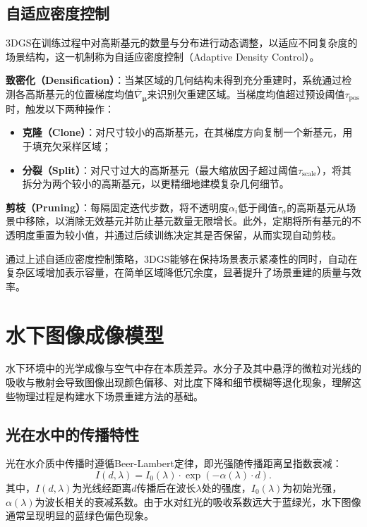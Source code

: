 \subsection{自适应密度控制}

3DGS在训练过程中对高斯基元的数量与分布进行动态调整，以适应不同复杂度的场景结构，这一机制称为自适应密度控制（Adaptive Density Control）。

\textbf{致密化（Densification）}：当某区域的几何结构未得到充分重建时，系统通过检测各高斯基元的位置梯度均值$\bar{\nabla}_{\boldsymbol{\mu}}$来识别欠重建区域。当梯度均值超过预设阈值$\tau_{\mathrm{pos}}$时，触发以下两种操作：
\begin{itemize}
    \item \textbf{克隆（Clone）}：对尺寸较小的高斯基元，在其梯度方向复制一个新基元，用于填充欠采样区域；
    \item \textbf{分裂（Split）}：对尺寸过大的高斯基元（最大缩放因子超过阈值$\tau_{\mathrm{scale}}$），将其拆分为两个较小的高斯基元，以更精细地建模复杂几何细节。
\end{itemize}

\textbf{剪枝（Pruning）}：每隔固定迭代步数，将不透明度$\alpha_i$低于阈值$\tau_{\alpha}$的高斯基元从场景中移除，以消除无效基元并防止基元数量无限增长。此外，定期将所有基元的不透明度重置为较小值，并通过后续训练决定其是否保留，从而实现自动剪枝。

通过上述自适应密度控制策略，3DGS能够在保持场景表示紧凑性的同时，自动在复杂区域增加表示容量，在简单区域降低冗余度，显著提升了场景重建的质量与效率。

\section{水下图像成像模型}

水下环境中的光学成像与空气中存在本质差异。水分子及其中悬浮的微粒对光线的吸收与散射会导致图像出现颜色偏移、对比度下降和细节模糊等退化现象，理解这些物理过程是构建水下场景重建方法的基础。

\subsection{光在水中的传播特性}

光在水介质中传播时遵循Beer-Lambert定律，即光强随传播距离呈指数衰减：
\begin{equation}
    I(d, \lambda) = I_0(\lambda) \cdot \exp(-\alpha(\lambda) \cdot d).
    \label{eq:beer_lambert}
\end{equation}其中，$I(d, \lambda)$为光线经距离$d$传播后在波长$\lambda$处的强度，$I_0(\lambda)$为初始光强，$\alpha(\lambda)$为波长相关的衰减系数。由于水对红光的吸收系数远大于蓝绿光，水下图像通常呈现明显的蓝绿色偏色现象。

